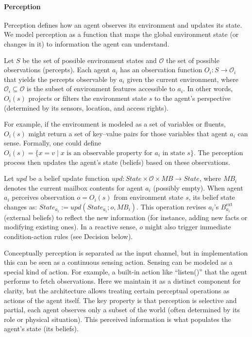 \paragraph{Perception}

Perception defines how an agent observes its environment and updates its state. We model perception as a function that maps the global environment state (or changes in it) to information the agent can understand.

Let $S$ be the set of possible environment states and $\mathcal{O}$ the set of possible observations (percepts). Each agent $a_i$ has an observation function $O_i: S \to \mathcal{O}_i$ that yields the percepts observable by $a_i$ given the current environment, where $\mathcal{O}_i \subseteq \mathcal{O}$ is the subset of environment features accessible to $a_i$. In other words, $O_i(s)$ projects or filters the environment state $s$ to the agent’s perspective (determined by its sensors, location, and access rights). 
	
For example, if the environment is modeled as a set of variables or fluents, $O_i(s)$ might return a set of key--value pairs for those variables that agent $a_i$ can sense. Formally, one could define $O_i(s) = \{x = v \mid x \text{ is an observable property for $a_i$ in state } s\}$. The perception process then updates the agent’s state (beliefs) based on these observations.
	
Let $upd$ be a belief update function $upd: State \times \mathcal{O} \times MB \to State$, where $MB_i$ denotes the current mailbox contents for agent $a_i$ (possibly empty). When agent $a_i$ perceives observation $o = O_i(s)$ from environment state $s$, its belief state changes as: $State_{a_i} := upd(State_{a_i}; o, MB_i)$. This operation revises $a_i$’s $B^{\text{ext}}_{a_i}$ (external beliefs) to reflect the new information (for instance, adding new facts or modifying existing ones). In a reactive sense, $o$ might also trigger immediate condition-action rules (see Decision below).

Conceptually perception is separated as the input channel, but in implementation this can be seen as a continuous sensing action. Sensing can be modeled as a special kind of action. For example, a built-in action like “listen()” that the agent performs to fetch observations. Here we maintain it as a distinct component for clarity, but the architecture allows treating certain perceptual operations as actions of the agent itself. The key property is that perception is selective and partial, each agent observes only a subset of the world (often determined by its role or physical situation). This perceived information is what populates the agent’s state (its beliefs).

